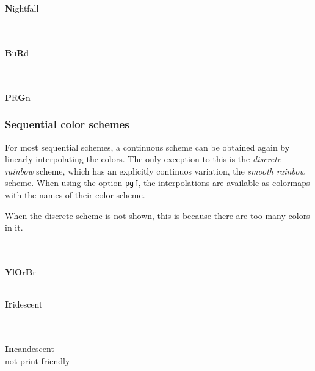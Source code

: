 \documentclass{scrartcl}
\begin{document}
\begin{center}
	\\
	\\
	\textbf{N}ightfall
\end{center}

\begin{center}
	\\
	\\
	\textbf{B}u\textbf{R}d
\end{center}

\begin{center}
	\\
	\\
	\textbf{P}R\textbf{G}n
\end{center}\clearpage

\subsubsection{Sequential color schemes}\label{sec:T-S}
For most sequential schemes, a continuous scheme can be obtained again by linearly interpolating the colors.
The only exception to this is the \emph{discrete rainbow} scheme, which has an explicitly continuos variation, the \emph{smooth rainbow} scheme.
When using the option \texttt{pgf}, the interpolations are available as colormaps with the names of their color scheme.

When the discrete scheme is not shown, this is because there are too many colors in it.

\begin{center}
	\\
	\\
	\textbf{Y}l\textbf{O}r\textbf{B}r
\end{center}

\begin{center}
	\\
	\textbf{Ir}idescent
\end{center}

\begin{center}
	\\
	\\
	\textbf{In}candescent\\
	not print-friendly
\end{center}
\end{document}

